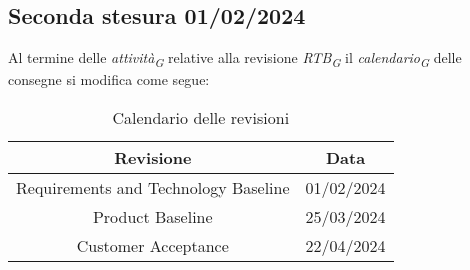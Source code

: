 \subsection{Seconda stesura 01/02/2024}\label{sec:SecondaStesuraCalendario}
Al termine delle \textit{attività}\textsubscript{\textit{G}} relative alla revisione \textit{RTB}\textsubscript{\textit{G}} il \textit{calendario}\textsubscript{\textit{G}} delle consegne si modifica come segue:
\begin{table}[H]
    \centering
    \begin{tabular}{|c|c|}
        \hline 
        \textbf{Revisione} & \textbf{Data} \\
        \hline
        Requirements and Technology Baseline & 01/02/2024 \\
        Product Baseline  & 25/03/2024 \\
        Customer Acceptance & 22/04/2024 \\
        \hline
    \end{tabular}
    \caption{Calendario delle revisioni}
\end{table}

\pagebreak